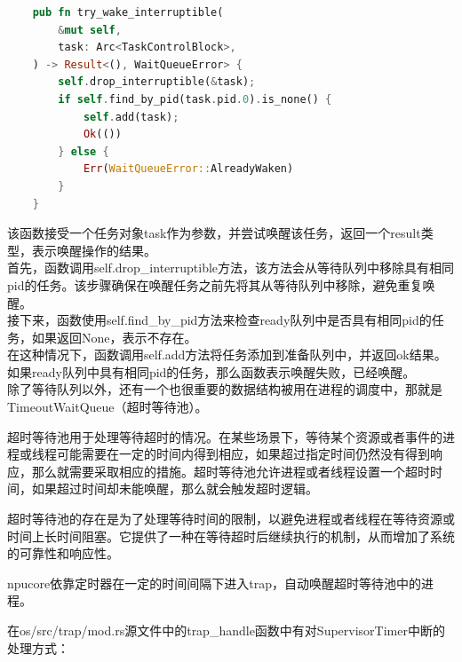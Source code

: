 \begin{lstlisting}[language=rust]
        pub fn try_wake_interruptible(
        &mut self,
        task: Arc<TaskControlBlock>,
    ) -> Result<(), WaitQueueError> {
        self.drop_interruptible(&task);
        if self.find_by_pid(task.pid.0).is_none() {
            self.add(task);
            Ok(())
        } else {
            Err(WaitQueueError::AlreadyWaken)
        }
    }
\end{lstlisting}
该函数接受一个任务对象task作为参数，并尝试唤醒该任务，返回一个result类型，表示唤醒操作的结果。\\
首先，函数调用self.drop_interruptible方法，该方法会从等待队列中移除具有相同pid的任务。该步骤确保在唤醒任务之前先将其从等待队列中移除，避免重复唤醒。\\
接下来，函数使用self.find_by_pid方法来检查ready队列中是否具有相同pid的任务，如果返回None，表示不存在。\\
在这种情况下，函数调用self.add方法将任务添加到准备队列中，并返回ok结果。\\
如果ready队列中具有相同pid的任务，那么函数表示唤醒失败，已经唤醒。\\

除了等待队列以外，还有一个也很重要的数据结构被用在进程的调度中，那就是TimeoutWaitQueue（超时等待池）。

超时等待池用于处理等待超时的情况。在某些场景下，等待某个资源或者事件的进程或线程可能需要在一定的时间内得到相应，如果超过指定时间仍然没有得到响应，那么就需要采取相应的措施。超时等待池允许进程或者线程设置一个超时时间，如果超过时间却未能唤醒，那么就会触发超时逻辑。

超时等待池的存在是为了处理等待时间的限制，以避免进程或者线程在等待资源或时间上长时间阻塞。它提供了一种在等待超时后继续执行的机制，从而增加了系统的可靠性和响应性。

npucore依靠定时器在一定的时间间隔下进入trap，自动唤醒超时等待池中的进程。

在os/src/trap/mod.rs源文件中的trap_handle函数中有对SupervisorTimer中断的处理方式：

